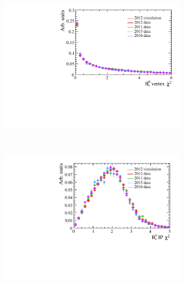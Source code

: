 \begin{figure}
 \begin{subfigure}[b]{0.48\textwidth}
        \includegraphics[width=\textwidth]{./Figs/Selection/bkgnd_vertex.pdf}
    \end{subfigure}
    ~ %
    \begin{subfigure}[b]{0.48\textwidth}
       \includegraphics[width=\textwidth]{./Figs/Selection/bkgnd_IPS.pdf}
    \end{subfigure}






\end{figure}
